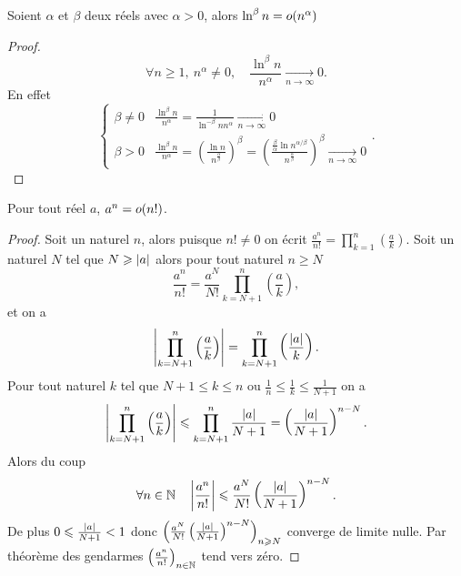 \begin{prop}
    Soient \(\alpha\) et \(\beta\) deux réels avec \(\alpha>0\), alors
    \(\ln^\beta n = o\mathopen{}\left(n^\alpha\right)\)
\end{prop}
\begin{proof}
    \begin{equation}
        \forall n \geqslant 1, \ n^\alpha \neq 0, \quad \frac{\ln^\beta
        n}{n^\alpha} \underset{n\to \infty}{\longrightarrow} 0.
    \end{equation}
    En effet
    \begin{equation}
        \begin{cases}
            \beta \neq 0 & \frac{\ln^\beta n}{n^\alpha} = \frac{1}{\ln^{-\beta} n
            n^\alpha} \underset{n\to \infty}{\longrightarrow} 0 \\
            \beta > 0 & \frac{\ln^\beta n}{n^\alpha} = \left(\frac{\ln
            n}{n^{\frac{\alpha}{\beta}}}\right)^\beta =
            \left(\frac{\frac{\beta}{\alpha}\ln
            n^{\alpha/\beta}}{n^{\frac{\alpha}{\beta}}}\right)^\beta
            \underset{n\to \infty}{\longrightarrow} 0
        \end{cases}.
    \end{equation}
\end{proof}

\begin{prop}
    Pour tout réel \(a\), \(a^n = o\mathopen{}\left(n!\right)\).
\end{prop}
\begin{proof}
    Soit un naturel \(n\), alors puisque \(n! \neq 0\) on écrit
    \(\frac{a^n}{n!}=\prod_{k = 1}^n \left(\frac{a}{k}\right)\). Soit un
    naturel \(N\) tel que \(N \geqslant \left\lvert a\right\rvert\) alors pour tout
    naturel \(n \geqslant N\)
    \begin{equation}
        \frac{a^n}{n!} = \frac{a^N}{N!} \prod_{k = N+1}^n
        \left(\frac{a}{k}\right),
    \end{equation}
    et on a
    \begin{equation}
        \left\lvert\prod_{k = N+1}^n \left(\frac{a}{k}\right)\right\rvert = \prod_{k =
        N+1}^n \left(\frac{\left\lvert a\right\rvert}{k}\right).
    \end{equation}
    Pour tout naturel \(k\) tel que \(N+1 \leqslant k \leqslant n\) ou
    \(\frac{1}{n} \leqslant \frac{1}{k} \leqslant \frac{1}{N+1}\) on a
    \begin{equation}
        \left\lvert\prod_{k = N+1}^n \left(\frac{a}{k}\right)\right\rvert \leqslant
        \prod_{k = N+1}^n \frac{\left\lvert a\right\rvert}{N+1} =
        \left(\frac{\left\lvert a\right\rvert}{N+1}\right)^{n-N}.
    \end{equation}
    Alors du coup
    \begin{equation}
        \forall n \in \mathbb{N} \quad \left\lvert\frac{a^n}{n!}\right\rvert \leqslant
        \frac{a^N}{N!} \left(\frac{\left\lvert a\right\rvert}{N+1}\right)^{n-N}.
    \end{equation}
    De plus \(0 \leqslant \frac{\left\lvert a\right\rvert}{N+1} < 1\) donc
    \(\left(\frac{a^N}{N!}
    \left(\frac{\left\lvert a\right\rvert}{N+1}\right)^{n-N}\right)_{n \geqslant N}\)
    converge de limite nulle. Par théorème des gendarmes
    \(\left(\frac{a^n}{n!}\right)_{n\in \mathbb{N}}\) tend vers zéro.
\end{proof}

